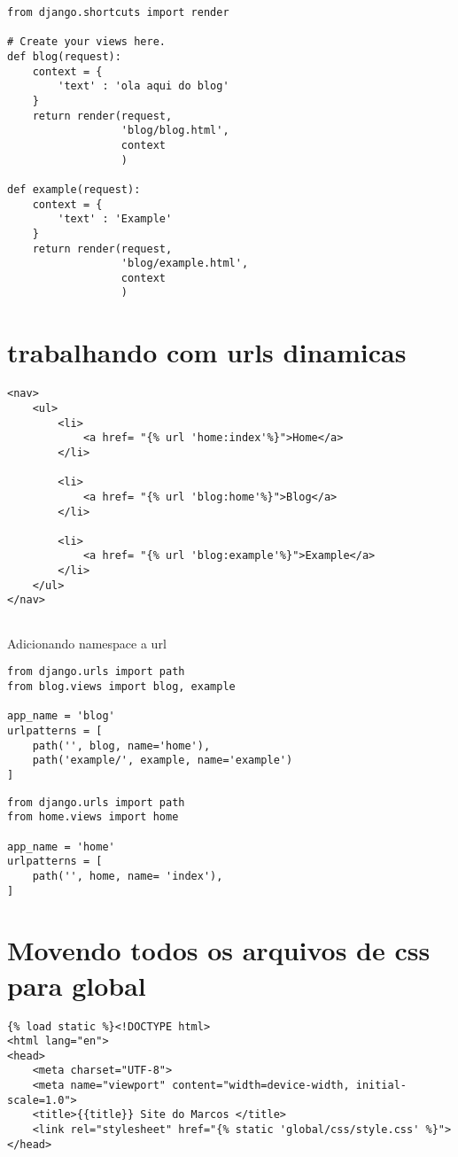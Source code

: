 \documentclass{article}
\begin{document}
\begin{lstlisting}[style=pythonStyle, caption={blog/views.py}]
    from django.shortcuts import render

# Create your views here.
def blog(request):
    context = {
        'text' : 'ola aqui do blog'
    }
    return render(request,
                  'blog/blog.html', 
                  context
                  )

def example(request):
    context = {
        'text' : 'Example'
    }
    return render(request, 
                  'blog/example.html', 
                  context
                  )

\end{lstlisting}
\section{trabalhando com urls dinamicas}
\begin{lstlisting}[style=htmlStyle, caption={base/global/partials/menu.html}]
    <nav> 
    <ul>
        <li>
            <a href= "{% url 'home:index'%}">Home</a>
        </li>   
        
        <li>
            <a href= "{% url 'blog:home'%}">Blog</a>
        </li>   

        <li>
            <a href= "{% url 'blog:example'%}">Example</a>
        </li>   
    </ul>    
</nav>
   
\end{lstlisting}



Adicionando namespace a url
\begin{lstlisting}[style=pythonStyle, caption={blog/urls.py}]
from django.urls import path
from blog.views import blog, example

app_name = 'blog'
urlpatterns = [
    path('', blog, name='home'),
    path('example/', example, name='example')
]
\end{lstlisting}

\begin{lstlisting}[style=pythonStyle, caption={home/urls.py}]
from django.urls import path
from home.views import home

app_name = 'home'
urlpatterns = [
    path('', home, name= 'index'),
]
\end{lstlisting}

\section{Movendo todos os arquivos de css para global}
\begin{lstlisting}[style=htmlStyle, caption={base/global/partials/head.html}]
    {% load static %}<!DOCTYPE html>
<html lang="en">
<head>
    <meta charset="UTF-8">
    <meta name="viewport" content="width=device-width, initial-scale=1.0">
    <title>{{title}} Site do Marcos </title>
    <link rel="stylesheet" href="{% static 'global/css/style.css' %}">
</head>
\end{lstlisting}   
\end{document}
